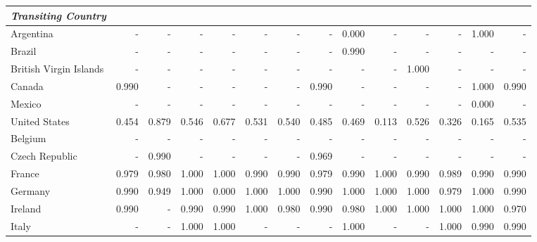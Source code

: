 \documentclass[10pt,twocolumn]{sig-alternate}
\begin{document}
\begin{table*}[t]
\centering
{}
\begin{adjustbox}{width=1\textwidth}
\small
\begin{tabular}{@{}ld{3.2}d{3.2}d{3.2}d{3.2}d{3.2}d{3.2}d{3.2}d{3.2}d{3.2}d{3.2}d{3.2}d{3.2}d{3.2}@{}}
\textit{Transiting Country} 
   &   &    &  &  &   &    &  &  &  &     &  &  & \\
\toprule
Argentina  & -  & -  & -  & -  & -  & -  & -  & 0.000 & -  & -  & -  & 1.000 & - \\
Brazil  & -  & -  & -  & -  & -  & -  & -  & 0.990 & -  & -  & -  & -  & - \\ \hline
British Virgin Islands  & -  & -  & -  & -  & -  & -  & -  & -  & -  & 1.000 & -  & -  & - \\
Canada  & 0.990 & -  & -  & -  & -  & -  & 0.990 & -  & -  & -  & -  & 1.000 & 0.990\\
Mexico  & -  & -  & -  & -  & -  & -  & -  & -  & -  & -  & -  & 0.000 & - \\
United States  & 0.454 & 0.879 & 0.546 & 0.677 & 0.531 & 0.540 & 0.485 & 0.469 & 0.113 & 0.526 & 0.326 & 0.165 & 0.535\\ \hline
Belgium  & -  & -  & -  & -  & -  & -  & -  & -  & -  & -  & -  & -  & - \\
Czech Republic  & -  & 0.990 & -  & -  & -  & -  & 0.969 & -  & -  & -  & -  & -  & - \\
France  & 0.979 & 0.980 & 1.000 & 1.000 & 0.990 & 0.990 & 0.979 & 0.990 & 1.000 & 0.990 & 0.989 & 0.990 & 0.990\\
Germany  & 0.990 & 0.949 & 1.000 & 0.000 & 1.000 & 1.000 & 0.990 & 1.000 & 1.000 & 1.000 & 0.979 & 1.000 & 0.990\\
Ireland  & 0.990 & -  & 0.990 & 0.990 & 1.000 & 0.980 & 0.990 & 0.980 & 1.000 & 1.000 & 1.000 & 1.000 & 0.970\\
Italy  & -  & -  & 1.000 & 1.000 & -  & -  & -  & 1.000 & -  & -  & 1.000 & 0.990 & 0.990\\

\end{tabular}
\end{adjustbox}
\end{table*}
\end{document}
